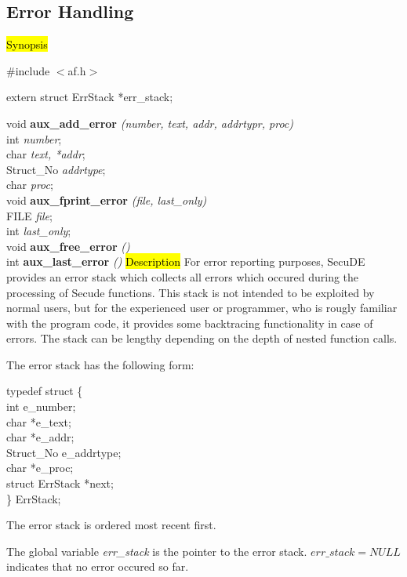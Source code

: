 \subsection{Error Handling}
\label{aux_error}
\hl{Synopsis}

\#include $<$af.h$>$ 


extern struct ErrStack *err\_stack; 


void {\bf aux\_add\_error} {\em (number, text, addr, addrtypr, proc)} \\
int {\em number}; \\
char {\em *text, *addr}; \\
Struct\_No {\em addrtype}; \\
char {\em *proc}; \\ [1em]
void {\bf aux\_fprint\_error} {\em (file, last\_only)} \\
FILE {\em *file}; \\
int {\em last\_only}; \\ [1em]
void {\bf aux\_free\_error} {\em ()} \\ [1em]
int {\bf aux\_last\_error} {\em ()}
\hl{Description}
For error reporting purposes, SecuDE provides an error stack which collects all
errors which occured during the processing of Secude functions. This stack is not
intended to be exploited by normal users, but for the experienced user or programmer,
who is rougly familiar with the program code, it provides some backtracing
functionality in case of errors. The stack can be lengthy depending on the depth
of nested function calls.  

The error stack has the following form: 

\bvtab
\2 typedef struct \{ \\
\4        int  \4            e\_number; \\
\4        char \4           *e\_text;   \\
\4        char \4           *e\_addr;   \\
\4        Struct\_No   \4     e\_addrtype; \\
\4        char \4           *e\_proc;   \\
\4        struct ErrStack  \4 *next;   \\
 \2 \} ErrStack; \\ 
\evtab

The error stack is ordered most recent first.
 
The global variable {\em err\_stack}
is the pointer to the error stack. $err\_stack = NULL$ indicates that no error occured so far.


